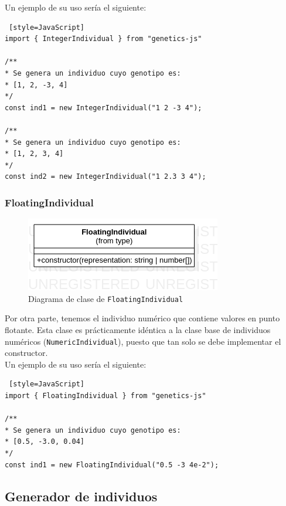 \clearpage

Un ejemplo de su uso sería el siguiente: \\

\begin{lstlisting} [style=JavaScript]
import { IntegerIndividual } from "genetics-js"

/**
* Se genera un individuo cuyo genotipo es:
* [1, 2, -3, 4]
*/
const ind1 = new IntegerIndividual("1 2 -3 4");

/**
* Se genera un individuo cuyo genotipo es:
* [1, 2, 3, 4]
*/
const ind2 = new IntegerIndividual("1 2.3 3 4");
\end{lstlisting}

\subsubsection{FloatingIndividual}

\begin{figure}[ht]
    \centering
    \includegraphics[scale=0.7]{mem/images/cap-4/4.2.2(Individuos)/FloatingIndividual.png}
    \caption{Diagrama de clase de \texttt{FloatingIndividual}}
    \label{fig:binaryindividual-uml}
\end{figure}

Por otra parte, tenemos el individuo numérico que contiene valores en punto flotante. Esta clase es prácticamente idéntica a la clase base de individuos numéricos (\texttt{NumericIndividual}), puesto que tan solo se debe implementar el constructor. \\

Un ejemplo de su uso sería el siguiente: \\

\begin{lstlisting} [style=JavaScript]
import { FloatingIndividual } from "genetics-js"

/**
* Se genera un individuo cuyo genotipo es:
* [0.5, -3.0, 0.04]
*/
const ind1 = new FloatingIndividual("0.5 -3 4e-2");
\end{lstlisting}


\subsection{Generador de individuos}

